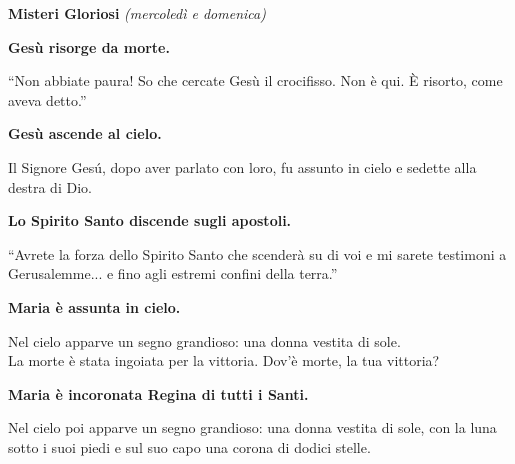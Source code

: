 \textbf{\large{Misteri Gloriosi}} \emph{(mercoledì e domenica)}
\setcounter{numstrofa}{0}

\medskip

\textbf{\strofa Gesù risorge da morte.}

``Non abbiate paura! So che cercate Gesù il crocifisso. Non è qui. È risorto, come aveva detto.''

\medskip

\textbf{\strofa Gesù ascende al cielo.}

Il Signore Gesú, dopo aver parlato con loro, fu assunto in cielo e sedette alla destra di Dio.

\medskip

\textbf{\strofa Lo Spirito Santo discende sugli apostoli.}

``Avrete la forza dello Spirito Santo che scenderà su di voi e mi sarete testimoni a Gerusalemme... e fino agli estremi confini della terra.''

\medskip

\textbf{\strofa Maria è assunta in cielo.}

Nel cielo apparve un segno grandioso: una donna vestita di sole.\\
La morte è stata ingoiata per la vittoria. Dov'è morte, la tua vittoria?

\medskip

\textbf{\strofa Maria è incoronata Regina di tutti i Santi.}

Nel cielo poi apparve un segno grandioso: una donna vestita di sole, con la luna sotto i suoi piedi e sul suo capo una corona di dodici stelle.
